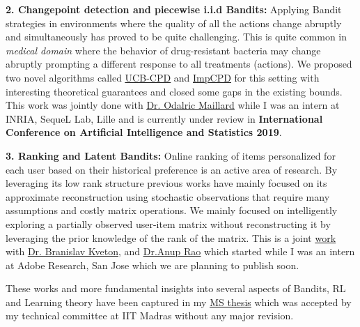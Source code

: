 \documentclass{article}
\begin{document}
\textbf{2. Changepoint detection and piecewise i.i.d Bandits:}  Applying Bandit strategies in environments where the quality of all the actions change abruptly and simultaneously has proved to be quite challenging. This is quite common in \textit{medical domain} where the behavior of drug-resistant bacteria may change abruptly prompting a different response to all treatments (actions). We proposed two novel algorithms called \href{https://subhojyoti.github.io/pdf/aistats_2019.pdf}{\underline{\color{blue}UCB-CPD}} and \href{https://subhojyoti.github.io/pdf/aistats_2019.pdf}{\underline{\color{blue}ImpCPD}} for this setting with interesting theoretical guarantees and closed some gaps in the existing bounds. This work was jointly done with \href{https://scholar.google.com/citations?user=7EweMdoAAAAJ&hl=en}{\underline{\color{red}Dr. Odalric Maillard}} while I was an intern at INRIA, SequeL Lab, Lille and is currently under review in \textbf{International Conference on Artificial Intelligence and Statistics 2019}. 


\textbf{3. Ranking and Latent Bandits:} Online ranking of items personalized for each user based on their historical preference is an active area of research. By leveraging its low rank structure previous works have mainly focused on its approximate reconstruction using stochastic observations that require many assumptions and costly matrix operations. We mainly focused on intelligently exploring a partially observed user-item matrix without reconstructing it by leveraging the prior knowledge of the rank of the matrix. This is a joint \href{https://subhojyoti.github.io/pdf/paper.pdf}{\underline{\color{blue} work}} with \href{http://www.bkveton.com/}{\underline{\color{red}Dr. Branislav Kveton}}, and \href{https://sites.google.com/site/anupraob/}{\underline{\color{red}Dr.Anup Rao}}  which started while I was an intern at Adobe Research, San Jose which we are planning to publish soon.

These works and more fundamental insights into several aspects of Bandits, RL and Learning theory have been captured in my \href{https://www.cse.iitm.ac.in/~ravi/papers/Subhojyoti_thesis.pdf}{\underline{\color{blue}MS thesis}} which was accepted by my technical committee at IIT Madras without any major revision.
	 
	
	
\end{document}
